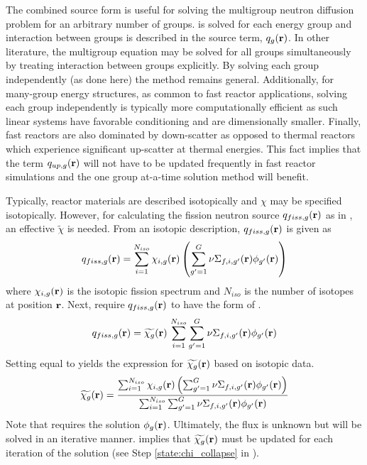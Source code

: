   The combined source form is useful for solving the multigroup neutron
  diffusion problem for an arbitrary number of groups.
   is solved for each energy group and interaction
  between groups is described in the source term, $q_g(\mathbf{r})$. In other
  literature, the multigroup equation may be solved for all groups
  simultaneously by treating interaction between groups explicitly. By solving
  each group independently (as done here) the method remains general.
  Additionally, for many-group energy structures, as common to fast reactor
  applications, solving each group independently is typically more
  computationally efficient as such linear systems have favorable conditioning
  and are dimensionally smaller. Finally, fast reactors are also dominated by
  down-scatter as opposed to thermal reactors which experience significant
  up-scatter at thermal energies. This fact implies that the term $q_{up,g}(\mathbf{r})$ 
  will not have to be updated frequently in fast reactor simulations and the one
  group at-a-time solution method will benefit.

  Typically, reactor materials are described isotopically and $\chi$ may be
  specified isotopically. However, for calculating the fission neutron source
  $q_{fiss,g}(\mathbf{r})$ as in , an effective $\widetilde{\chi}$ is 
  needed. From an isotopic description, $q_{fiss,g}(\mathbf{r})$ is given as
  \begin{equation}
    \label{eq:isotopic_chi}
    q_{fiss,g}(\mathbf{r}) = \sum_{i=1}^{N_{iso}} \chi_{i,g}(\mathbf{r} )\left( \sum_{g'=1}^G
      \nu \Sigma_{f,i,g'}(\mathbf{r}) \phi_{g'}(\mathbf{r}) \right)
  \end{equation}
  where $\chi_{i,g}(\mathbf{r})$ is the isotopic fission spectrum and $N_{iso}$ is the 
  number of isotopes at position $\mathbf{r}$. Next, require $q_{fiss,g}(\mathbf{r})$ to have 
  the form of .
  \begin{equation}
    \label{eq:element_chi}
    q_{fiss,g}(\mathbf{r}) = \widetilde{\chi_g}(\mathbf{r}) \, 
      \sum_{i=1}^{N_{iso}} \sum_{g'=1}^G \nu \Sigma_{f,i,g'}(\mathbf{r}) \phi_{g'}(\mathbf{r})
  \end{equation}
  Setting  equal to  yields the
  expression for $\widetilde{\chi_g}(\mathbf{r})$ based on isotopic data.
  \begin{equation}
    \label{eq:chi_collapse}
    \widetilde{\chi_g}(\mathbf{r}) = \frac{\sum_{i=1}^{N_{iso}} \chi_{i,g}(\mathbf{r})
      \left( \sum_{g'=1}^G
      \nu \Sigma_{f,i,g'}(\mathbf{r}) \phi_{g'}(\mathbf{r}) \right)}
      {\sum_{i=1}^{N_{iso}} \sum_{g'=1}^G \nu \Sigma_{f,i,g'}(\mathbf{r}) \phi_{g'}(\mathbf{r})}
  \end{equation}
  Note that  requires the solution $\phi_g(\mathbf{r})$.
  Ultimately, the flux is unknown but will be solved in an iterative manner.
   implies that $\widetilde{\chi_g}(\mathbf{r})$ must be updated
  for each iteration of the solution (see Step \ref{state:chi_collapse} in
  ).

